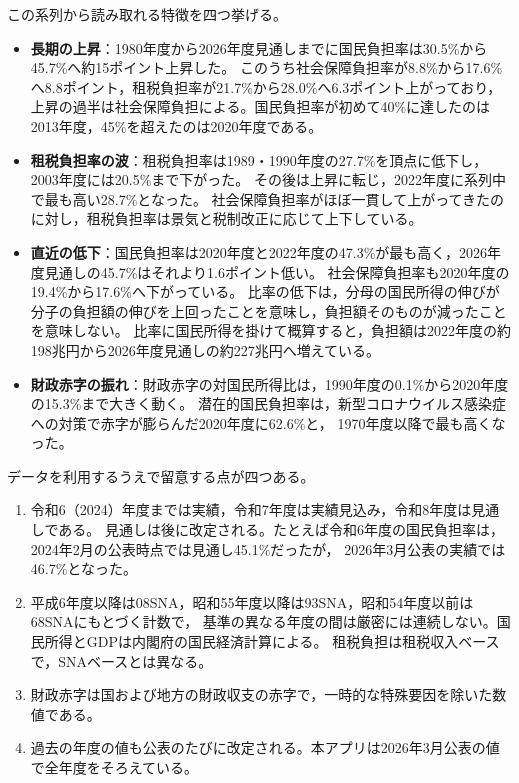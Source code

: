 \documentclass[paper=a4,fontsize=10pt]{jlreq}
\begin{document}
この系列から読み取れる特徴を四つ挙げる。
\begin{itemize}
  \item \textbf{長期の上昇}：1980年度から2026年度見通しまでに国民負担率は30.5\%から45.7\%へ約15ポイント上昇した。
    このうち社会保障負担率が8.8\%から17.6\%へ8.8ポイント，租税負担率が21.7\%から28.0\%へ6.3ポイント上がっており，
    上昇の過半は社会保障負担による。国民負担率が初めて40\%に達したのは2013年度，45\%を超えたのは2020年度である。
  \item \textbf{租税負担率の波}：租税負担率は1989・1990年度の27.7\%を頂点に低下し，2003年度には20.5\%まで下がった。
    その後は上昇に転じ，2022年度に系列中で最も高い28.7\%となった。
    社会保障負担率がほぼ一貫して上がってきたのに対し，租税負担率は景気と税制改正に応じて上下している。
  \item \textbf{直近の低下}：国民負担率は2020年度と2022年度の47.3\%が最も高く，2026年度見通しの45.7\%はそれより1.6ポイント低い。
    社会保障負担率も2020年度の19.4\%から17.6\%へ下がっている。
    比率の低下は，分母の国民所得の伸びが分子の負担額の伸びを上回ったことを意味し，負担額そのものが減ったことを意味しない。
    比率に国民所得を掛けて概算すると，負担額は2022年度の約198兆円から2026年度見通しの約227兆円へ増えている。
  \item \textbf{財政赤字の振れ}：財政赤字の対国民所得比は，1990年度の0.1\%から2020年度の15.3\%まで大きく動く。
    潜在的国民負担率は，新型コロナウイルス感染症への対策で赤字が膨らんだ2020年度に62.6\%と，
    1970年度以降で最も高くなった。
\end{itemize}

データを利用するうえで留意する点が四つある。
\begin{enumerate}
  \item 令和6（2024）年度までは実績，令和7年度は実績見込み，令和8年度は見通しである。
    見通しは後に改定される。たとえば令和6年度の国民負担率は，2024年2月の公表時点では見通し45.1\%だったが\cite{mof2024}，
    2026年3月公表の実績では46.7\%となった。
  \item 平成6年度以降は08SNA，昭和55年度以降は93SNA，昭和54年度以前は68SNAにもとづく計数で，
    基準の異なる年度の間は厳密には連続しない。国民所得とGDPは内閣府の国民経済計算\cite{sna}による。
    租税負担は租税収入ベースで，SNAベースとは異なる。
  \item 財政赤字は国および地方の財政収支の赤字で，一時的な特殊要因を除いた数値である。
  \item 過去の年度の値も公表のたびに改定される。本アプリは2026年3月公表の値で全年度をそろえている。
\end{enumerate}
\end{document}
